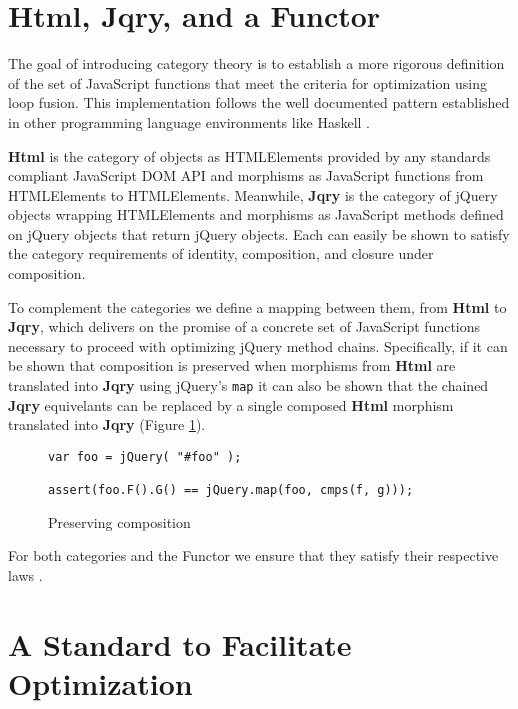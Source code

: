 \documentclass[preprint]{sigplanconf}
\begin{document}
\section{Html, Jqry, and a Functor}

The goal of introducing category theory is to establish a more rigorous definition of the set of JavaScript functions that meet the criteria for optimization using loop fusion. This implementation follows the well documented pattern established in other programming language environments like Haskell \cite[p. ~90]{bib:haskell-functor}.

\textbf{Html} is the category of objects as HTMLElements provided by any standards compliant JavaScript DOM API \cite{bib:htmlelement, bib:all-htmlelements} and morphisms as JavaScript functions from HTMLElements to HTMLElements. Meanwhile, \textbf{Jqry} is the category of jQuery objects wrapping HTMLElements and morphisms as JavaScript methods defined on jQuery objects that return jQuery objects. Each can easily be shown to satisfy the category requirements of identity, composition, and closure under composition.

To complement the categories we define a mapping between them, from \textbf{Html} to \textbf{Jqry}, which delivers on the promise of a concrete set of JavaScript functions necessary to proceed with optimizing jQuery method chains. Specifically, if it can be shown that composition is preserved when morphisms from \textbf{Html} are translated into \textbf{Jqry} using jQuery's \verb|map| it can also be shown that the chained \textbf{Jqry} equivelants can be replaced by a single composed \textbf{Html} morphism translated into \textbf{Jqry} (Figure \ref{fig:compose}).

\begin{figure}[!ht]
\small
\begin{verbatim}
var foo = jQuery( "#foo" );

assert(foo.F().G() == jQuery.map(foo, cmps(f, g)));
\end{verbatim}
\nocaptionrule \caption{Preserving composition}
\label{fig:compose}
\end{figure}

For both categories and the Functor we ensure that they satisfy their respective laws \cite[p. ~1]{bib:category-definition}.

\section{A Standard to Facilitate Optimization}
\end{document}
